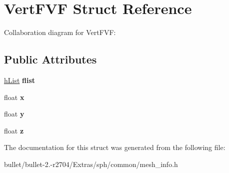 \hypertarget{struct_vert_f_v_f}{\section{Vert\+F\+V\+F Struct Reference}
\label{struct_vert_f_v_f}
}


Collaboration diagram for Vert\+F\+V\+F\+:
\subsection*{Public Attributes}
\begin{DoxyCompactItemize}
\item 
\hypertarget{struct_vert_f_v_f_a6022ce054511c4b34a686cdb2aa7e0dc}{\hyperlink{structh_list}{h\+List} {\bfseries flist}}\label{struct_vert_f_v_f_a6022ce054511c4b34a686cdb2aa7e0dc}

\item 
\hypertarget{struct_vert_f_v_f_a5de65dd74abfc3cc4dff9d2882123a4a}{float {\bfseries x}}\label{struct_vert_f_v_f_a5de65dd74abfc3cc4dff9d2882123a4a}

\item 
\hypertarget{struct_vert_f_v_f_aad155a5141e6dd44e8229d552eb22705}{float {\bfseries y}}\label{struct_vert_f_v_f_aad155a5141e6dd44e8229d552eb22705}

\item 
\hypertarget{struct_vert_f_v_f_a8aab77ae6ac4ba63f202112925861b34}{float {\bfseries z}}\label{struct_vert_f_v_f_a8aab77ae6ac4ba63f202112925861b34}

\end{DoxyCompactItemize}


The documentation for this struct was generated from the following file\+:\begin{DoxyCompactItemize}
\item 
bullet/bullet-\/2.-\/r2704/\+Extras/sph/common/mesh\+\_\+info.\+h\end{DoxyCompactItemize}
